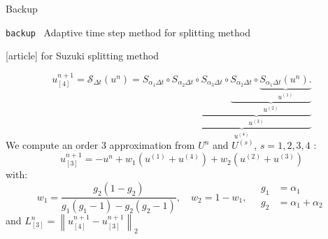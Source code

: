 \documentclass{beamer}
\newcommand{\customcite}[1]{\cite{#1}}
\newenvironment{bframe}[1]%
{%
  \begin{frame}{{\small\texttt{backup}\ } #1}
}%
{%
  \end{frame}
}
\begin{document}
\begin{frame}[plain]
  \vspace{0.65\textwidth}
  \hfill\footnotesize{Backup}
\end{frame}
\begin{bframe}{Adaptive time step method for splitting method}
  \begin{thebibliography}{9}
    [article]
     \customcite{Blanes:2019} \textcolor{defaultcolor}{for Suzuki splitting method}
  \end{thebibliography}
  $$
    u^{n+1}_{[4]} = \mathcal{S}_{\Delta t}(u^n)
      = S_{\alpha_1\Delta t}
        \circ \underbrace{ S_{\alpha_2\Delta t}
        \circ \underbrace{ S_{\alpha_3\Delta t}
        \circ \underbrace{ S_{\alpha_2\Delta t}
        \circ \underbrace{ S_{\alpha_1\Delta t} (u^n). }_{u^{(1)}}
                                                       }_{u^{(2)}}
                                                       }_{u^{(3)}}
                                                       }_{u^{(4)}}
  $$
  We compute an order 3 approximation from $U^n$ and $U^{(s)}$, $s=1,2,3,4$ :
  $$
    u^{n+1}_{[3]} = -u^n + w_1(u^{(1)}+u^{(4)}) + w_2(u^{(2)}+u^{(3)})
  $$
  with:
  $$
    w_1 = \frac{g_2(1-g_2)}{g_1(g_1-1)-g_2(g_2-1)},\quad w_2 = 1-w_1, \quad \begin{aligned}g_1 &= \alpha_1\\ g_2&=\alpha_1+\alpha_2\end{aligned}
  $$
  and $L^{n}_{[3]} = \left\| u^{n+1}_{[4]} - u^{n+1}_{[3]} \right\|_2$
\end{bframe}
\end{document}
